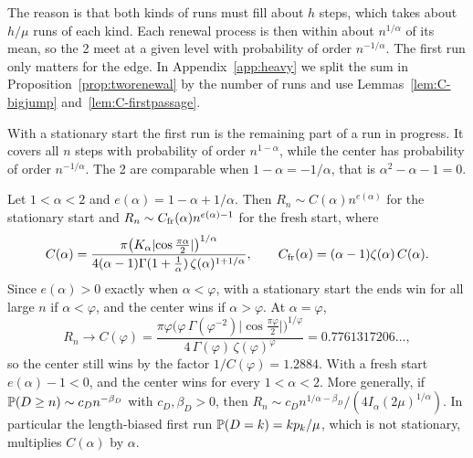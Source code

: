 The reason is that both kinds of runs must fill about $h$ steps, which takes
about $h/\mu$ runs of each kind. Each renewal process is then within about
$n^{1/\alpha}$ of its mean, so the 2 meet at a given level with probability
of order $n^{-1/\alpha}$. The first run only matters for the edge. In
Appendix~\ref{app:heavy} we split the sum in
Proposition~\ref{prop:tworenewal} by the number of runs and use
Lemmas~\ref{lem:C-bigjump} and~\ref{lem:C-firstpassage}.

With a stationary start the first run is the remaining part of a run in
progress. It covers all $n$ steps with probability of order $n^{1-\alpha}$,
while the center has probability of order $n^{-1/\alpha}$. The 2 are
comparable when $1-\alpha=-1/\alpha$, that is $\alpha^2-\alpha-1=0$.

\begin{corollary}\label{cor:golden}
Let $1<\alpha<2$ and $e(\alpha)=1-\alpha+1/\alpha$. Then
$R_n\sim C(\alpha)n^{e(\alpha)}$ for the stationary start and
$R_n\sim C_{\rm fr}(\alpha)n^{e(\alpha)-1}$ for the fresh start, where
\[
 C(\alpha)=\frac{\pi\bigl(K_\alpha\lvert\cos\frac{\pi\alpha}2\rvert
 \bigr)^{1/\alpha}}{4(\alpha-1)\Gamma(1+\frac1\alpha)\,
 \zeta(\alpha)^{1+1/\alpha}},\qquad
 C_{\rm fr}(\alpha)=(\alpha-1)\zeta(\alpha)\,C(\alpha).
\]
Since $e(\alpha)>0$ exactly when $\alpha<\varphi$, with a stationary start
the ends win for all large $n$ if $\alpha<\varphi$, and the center wins if
$\alpha>\varphi$. At $\alpha=\varphi$,
\[
 R_n\to C(\varphi)=\frac{\pi\varphi\bigl(\varphi\,\Gamma(\varphi^{-2})\lvert
 \cos\frac{\pi\varphi}2\rvert\bigr)^{1/\varphi}}{4\,\Gamma(\varphi)\,
 \zeta(\varphi)^{\varphi}}=0.7761317206\ldots,
\]
so the center still wins by the factor $1/C(\varphi)=1.2884$. With a fresh
start $e(\alpha)-1<0$, and the center wins for every $1<\alpha<2$. More
generally, if $\mathbb{P}(D\ge n)\sim c_Dn^{-\beta_D}$ with $c_D,\beta_D>0$, then
$R_n\sim c_Dn^{1/\alpha-\beta_D}/(4I_\alpha(2\mu)^{1/\alpha})$. In particular
the length-biased first run $\mathbb{P}(D=k)=kp_k/\mu$, which is not stationary,
multiplies $C(\alpha)$ by $\alpha$.
\end{corollary}

